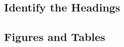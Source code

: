 \documentclass[conference]{IEEEtran}
\begin{document}
\subsection{Identify the Headings}\label{ITH}
%
%

\subsection{Figures and Tables}\label{FAT}
\end{document}
